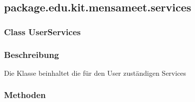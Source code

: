 \documentclass[a4paper]{scrreprt}
\begin{document}



\subsection{package.edu.kit.mensameet.services}
\subsubsection{Class UserServices}
\subsubsection*{Beschreibung}
Die Klasse beinhaltet die für den User zuständigen Services

\subsubsection*{Methoden}
\end{document}
